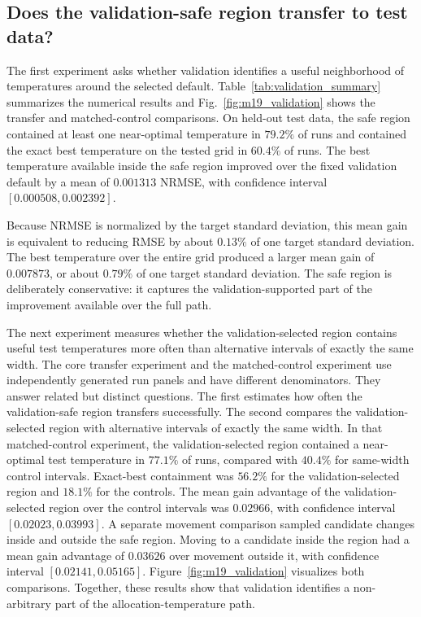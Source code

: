 \documentclass[11pt,a4paper]{article}
\begin{document}
\subsection{Does the validation-safe region transfer to test data?}

The first experiment asks whether validation identifies a useful neighborhood of temperatures around the selected default. Table~\ref{tab:validation_summary} summarizes the numerical results and Fig.~\ref{fig:m19_validation} shows the transfer and matched-control comparisons. On held-out test data, the safe region contained at least one near-optimal temperature in $79.2\%$ of runs and contained the exact best temperature on the tested grid in $60.4\%$ of runs. The best temperature available inside the safe region improved over the fixed validation default by a mean of $0.001313$ NRMSE, with confidence interval $[0.000508,0.002392]$.

Because NRMSE is normalized by the target standard deviation, this mean gain is equivalent to reducing RMSE by about $0.13\%$ of one target standard deviation. The best temperature over the entire grid produced a larger mean gain of $0.007873$, or about $0.79\%$ of one target standard deviation. The safe region is deliberately conservative: it captures the validation-supported part of the improvement available over the full path.

The next experiment measures whether the validation-selected region contains useful test temperatures more often than alternative intervals of exactly the same width. The core transfer experiment and the matched-control experiment use independently generated run panels and have different denominators. They answer related but distinct questions. The first estimates how often the validation-safe region transfers successfully. The second compares the validation-selected region with alternative intervals of exactly the same width. In that matched-control experiment, the validation-selected region contained a near-optimal test temperature in $77.1\%$ of runs, compared with $40.4\%$ for same-width control intervals. Exact-best containment was $56.2\%$ for the validation-selected region and $18.1\%$ for the controls. The mean gain advantage of the validation-selected region over the control intervals was $0.02966$, with confidence interval $[0.02023,0.03993]$. A separate movement comparison sampled candidate changes inside and outside the safe region. Moving to a candidate inside the region had a mean gain advantage of $0.03626$ over movement outside it, with confidence interval $[0.02141,0.05165]$. Figure~\ref{fig:m19_validation} visualizes both comparisons. Together, these results show that validation identifies a non-arbitrary part of the allocation-temperature path.
\end{document}
